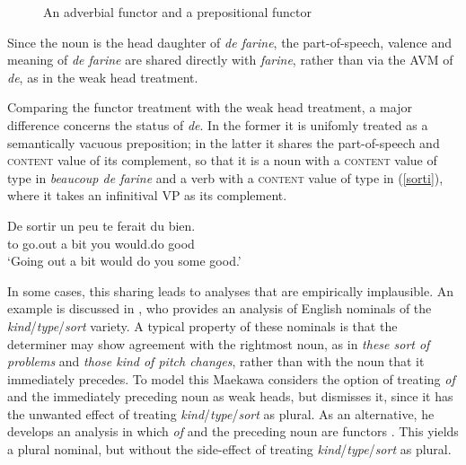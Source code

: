 \documentclass[output=paper
	        ,collection
	        ,collectionchapter
 	        ,biblatex
                ,babelshorthands
                ,newtxmath
                ,draftmode
                ,colorlinks, citecolor=brown
]{langscibook}
\begin{document}
\begin{figure}
\centering
{}
\caption{\label{beau} An adverbial functor and a prepositional functor}
\end{figure}

Since the noun is the head daughter of \emph{de farine}, the 
part-of-speech, valence and meaning of \emph{de farine} 
are shared directly with \emph{farine}, 
rather than via the AVM of \emph{de}, as in the weak head treatment. 

Comparing the functor treatment with the weak head treatment,  
a major difference concerns the status of \emph{de}. In the former it is 
unifomly treated as a semantically vacuous preposition; in the latter it shares 
the part-of-speech and \textsc{content} value of its complement, so that it is 
a noun with a \textsc{content} value of type  in 
\emph{beaucoup de farine} and a verb with a \textsc{content} value of type 
 in (\ref{sorti}), where it takes 
an infinitival VP as its complement.   

\begin{exe} 
\ex\label{sorti}   
\gll   De sortir un peu te ferait du bien.  \\
       to go.out a bit you would.do {} good \\
\trans `Going out a bit would do you some good.'
\end{exe}  

\noindent
In some cases, this sharing leads to analyses that are empirically implausible. 
An example is discussed in \citet{Maekawa15}, who provides  
an analysis of English nominals of the \emph{kind}/\emph{type}/\emph{sort} variety.  
A typical property of these nominals is that the determiner may show agreement with the 
rightmost noun, as in \emph{these sort of problems} and \emph{those kind of pitch changes},
rather than with the noun that it immediately precedes. 
To model this Maekawa considers the option of treating \emph{of} and the immediately 
preceding noun as weak heads, but dismisses it, since it has the unwanted effect of treating 
\emph{kind}/\emph{type}/\emph{sort} as plural. 
As an alternative, he develops an analysis in which \emph{of} and 
the preceding noun are functors \citep[149]{Maekawa15}. This yields a plural nominal, but 
without the side-effect of treating \emph{kind}/\emph{type}/\emph{sort} as plural. 
\end{document}
